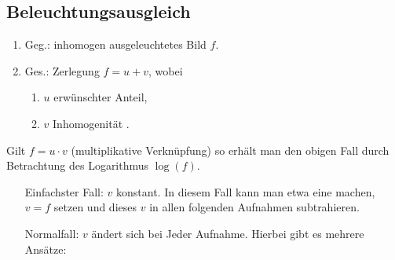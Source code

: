 \subsection{Beleuchtungsausgleich}

\begin{enumerate}[label = ]
    \item Geg.: inhomogen ausgeleuchtetes Bild $f$.
    \item Ges.: Zerlegung $f = u + v$, wobei
        \begin{enumerate}[label = ]
            \item $u$ erwünschter Anteil,
            \item $v$ Inhomogenität .
        \end{enumerate}
\end{enumerate}
Gilt $f = u \cdot v$ (multiplikative Verknüpfung) so erhält man den obigen Fall durch Betrachtung des Logarithmus $\log(f)$.

\begin{enumerate}
  \item[Einfachster Fall:] $v$ konstant. In diesem Fall kann man etwa eine  machen, $v=f$ setzen und dieses $v$ in allen folgenden Aufnahmen subtrahieren.
  \item[Normalfall:] $v$ ändert sich bei Jeder Aufnahme. Hierbei gibt es mehrere Ansätze:
\end{enumerate}


